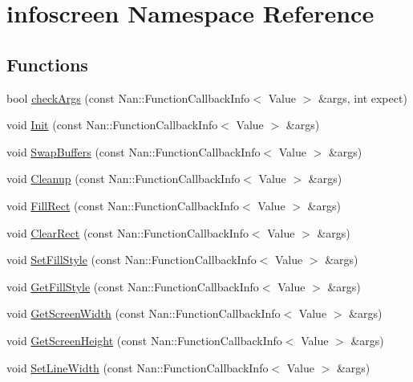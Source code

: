 \hypertarget{namespaceinfoscreen}{}\section{infoscreen Namespace Reference}
\label{namespaceinfoscreen}
\subsection*{Functions}
\begin{DoxyCompactItemize}
\item 
bool \hyperlink{namespaceinfoscreen_acd00d755c1f111a22ef51e6221cedeed}{check\+Args} (const Nan\+::\+Function\+Callback\+Info$<$ Value $>$ \&args, int expect)
\item 
void \hyperlink{namespaceinfoscreen_ab1428a51abf260080b69e8d006506f81}{Init} (const Nan\+::\+Function\+Callback\+Info$<$ Value $>$ \&args)
\item 
void \hyperlink{namespaceinfoscreen_a39bb7efb7b303f11f98fe9306ff3f2cb}{Swap\+Buffers} (const Nan\+::\+Function\+Callback\+Info$<$ Value $>$ \&args)
\item 
void \hyperlink{namespaceinfoscreen_a36d82bf11fc5003113bb5c8e49365fce}{Cleanup} (const Nan\+::\+Function\+Callback\+Info$<$ Value $>$ \&args)
\item 
void \hyperlink{namespaceinfoscreen_aa94a1703482ec48e506af123d2be3205}{Fill\+Rect} (const Nan\+::\+Function\+Callback\+Info$<$ Value $>$ \&args)
\item 
void \hyperlink{namespaceinfoscreen_af44a7e2ee22b905ec2cfa78fdb66a681}{Clear\+Rect} (const Nan\+::\+Function\+Callback\+Info$<$ Value $>$ \&args)
\item 
void \hyperlink{namespaceinfoscreen_a78d00d35dda40f8772317abc38888e9b}{Set\+Fill\+Style} (const Nan\+::\+Function\+Callback\+Info$<$ Value $>$ \&args)
\item 
void \hyperlink{namespaceinfoscreen_ac09a57011e1e034d8c3c76d6ac687d72}{Get\+Fill\+Style} (const Nan\+::\+Function\+Callback\+Info$<$ Value $>$ \&args)
\item 
void \hyperlink{namespaceinfoscreen_a6ecd27fa932c37f022090ef9a155c911}{Get\+Screen\+Width} (const Nan\+::\+Function\+Callback\+Info$<$ Value $>$ \&args)
\item 
void \hyperlink{namespaceinfoscreen_a998f8834071c3f3f6e0e5dfbd15e0079}{Get\+Screen\+Height} (const Nan\+::\+Function\+Callback\+Info$<$ Value $>$ \&args)
\item 
void \hyperlink{namespaceinfoscreen_a4d5adc4e6c7bee4f1fe33ab543de0117}{Set\+Line\+Width} (const Nan\+::\+Function\+Callback\+Info$<$ Value $>$ \&args)

\end{DoxyCompactItemize}
